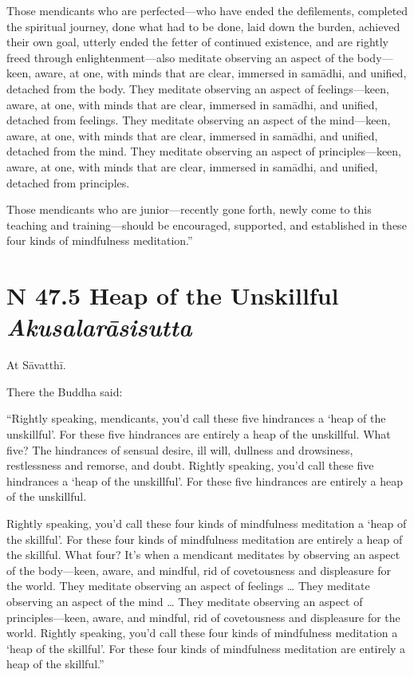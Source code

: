 \documentclass[12pt,openany]{book}%
\newcommand*{\suttatitleacronym}[1]{\smaller[2]{#1}\vspace*{.3em}}
\newcommand*{\suttatitletranslation}[1]{\linebreak{#1}}
\newcommand*{\suttatitleroot}[1]{\linebreak\smaller[2]\itshape{#1}}
\newcommand*{\tocacronym}[1]{\hspace*{-3.3em}{#1}\quad}
\newcommand*{\toctranslation}[1]{#1}
\newcommand*{\tocroot}[1]{(\textit{#1})}
\begin{document}
Those mendicants who are perfected—who have ended the defilements, completed the spiritual journey, done what had to be done, laid down the burden, achieved their own goal, utterly ended the fetter of continued existence, and are rightly freed through enlightenment—also meditate observing an aspect of the body—keen, aware, at one, with minds that are clear, immersed in \textsanskrit{samādhi}, and unified, detached from the body. They meditate observing an aspect of feelings—keen, aware, at one, with minds that are clear, immersed in \textsanskrit{samādhi}, and unified, detached from feelings. They meditate observing an aspect of the mind—keen, aware, at one, with minds that are clear, immersed in \textsanskrit{samādhi}, and unified, detached from the mind. They meditate observing an aspect of principles—keen, aware, at one, with minds that are clear, immersed in \textsanskrit{samādhi}, and unified, detached from principles. 

Those mendicants who are junior—recently gone forth, newly come to this teaching and training—should be encouraged, supported, and established in these four kinds of mindfulness meditation.” 

%
\section*{{\suttatitleacronym SN 47.5}{\suttatitletranslation A Heap of the Unskillful }{\suttatitleroot Akusalarāsisutta}}
\addcontentsline{toc}{section}{\tocacronym{SN 47.5} \toctranslation{A Heap of the Unskillful } \tocroot{Akusalarāsisutta}}

At \textsanskrit{Sāvatthī}. 

There the Buddha said: 

“Rightly speaking, mendicants, you’d call these five hindrances a ‘heap of the unskillful’. For these five hindrances are entirely a heap of the unskillful. What five? The hindrances of sensual desire, ill will, dullness and drowsiness, restlessness and remorse, and doubt. Rightly speaking, you’d call these five hindrances a ‘heap of the unskillful’. For these five hindrances are entirely a heap of the unskillful. 

Rightly speaking, you’d call these four kinds of mindfulness meditation a ‘heap of the skillful’. For these four kinds of mindfulness meditation are entirely a heap of the skillful. What four? It’s when a mendicant meditates by observing an aspect of the body—keen, aware, and mindful, rid of covetousness and displeasure for the world. They meditate observing an aspect of feelings … They meditate observing an aspect of the mind … They meditate observing an aspect of principles—keen, aware, and mindful, rid of covetousness and displeasure for the world. Rightly speaking, you’d call these four kinds of mindfulness meditation a ‘heap of the skillful’. For these four kinds of mindfulness meditation are entirely a heap of the skillful.” 
\end{document}

